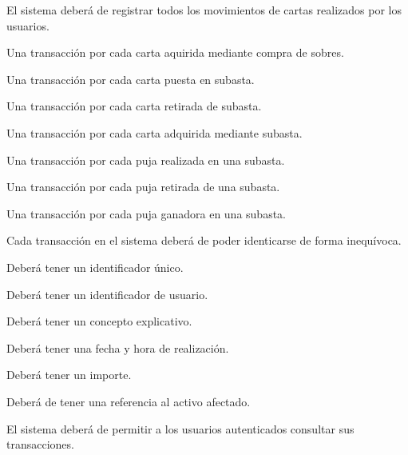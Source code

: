 

\label{req_transacciones} \hypertarget{req_transacciones}{}
\begin{RFTransacciones}
	\item El sistema deberá de registrar todos los movimientos de cartas realizados por los usuarios.
	\begin{RFTransacciones}
		\item Una transacción por cada carta aquirida mediante compra de sobres.
		\item Una transacción por cada carta puesta en subasta.
		\item Una transacción por cada carta retirada de subasta.
		\item Una transacción por cada carta adquirida mediante subasta.
		\item Una transacción por cada puja realizada en una subasta.
		\item Una transacción por cada puja retirada de una subasta.
		\item Una transacción por cada puja ganadora en una subasta.
	\end{RFTransacciones}
	\item Cada transacción en el sistema deberá de poder identicarse de forma inequívoca. \hypertarget{RT-2}{}
	\begin{RFTransacciones}
		\item Deberá tener un identificador único.
		\item Deberá tener un identificador de usuario.
		\item Deberá tener un concepto explicativo.
		\item Deberá tener una fecha y hora de realización.
		\item Deberá tener un importe.
		\item Deberá de tener una referencia al activo afectado.
	\end{RFTransacciones}
	\item El sistema deberá de permitir a los usuarios autenticados consultar sus transacciones.

\end{RFTransacciones}
